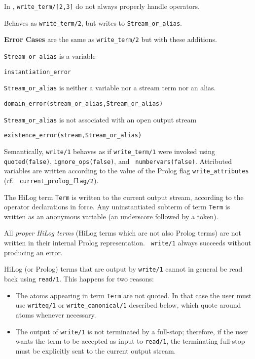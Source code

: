 \begin{description}
\compatibility In \version{}, {\tt write\_term/[2,3]} do not always
properly handle operators.

% 
Behaves as {\tt write\_term/2}, but writes to {\tt Stream\_or\_alias}.

{\bf Error Cases} are the same as {\tt write\_term/2} but with these
additions.
\bi
\item 	{\tt Stream\_or\_alias} is a variable
\bi
\item {\tt instantiation\_error}
\ei
\item 	{\tt Stream\_or\_alias} is neither a variable nor a stream term nor an alias.
\bi
\item 	{\tt domain\_error(stream\_or\_alias,Stream\_or\_alias)}
\ei
\item 	{\tt Stream\_or\_alias} is not associated with an open output stream
\bi
\item 	{\tt existence\_error(stream,Stream\_or\_alias)}
\ei
\ei

% 
Semantically, {\tt write/1} behaves as if {\tt write\_term/1} were
invoked using {\tt quoted(false)}, {\tt ignore\_ops(false)}, and {\tt
  numbervars(false)}.  Attributed variables are written according to
the value of the Prolog flag {\tt write\_attributes} (cf. {\tt
  current\_prolog\_flag/2}).

The HiLog term {\tt Term} is written to the current output stream,
according to the operator declarations in force.  Any uninstantiated
subterm of term {\tt Term} is written as an anonymous variable (an
underscore followed by a token).  

All {\em proper HiLog terms} (HiLog terms which are not also Prolog
terms) are not written in their internal Prolog representation.  {\tt
  write/1} always succeeds without producing an error.

HiLog (or Prolog) terms that are output by {\tt write/1} cannot in
general be read back using {\tt read/1}.  This happens for two
reasons:
    \begin{itemize}
    \item The atoms appearing in term {\tt Term} are not quoted. In that case 
          the user must use {\tt writeq/1} or 
          {\tt write\_canonical/1} described below, which quote around atoms 
          whenever necessary.
    \item The output of {\tt write/1} is not terminated by a full-stop;
          therefore, if the user wants the term to be accepted as input to
          {\tt read/1}, the terminating full-stop must be explicitly sent 
          to the current output stream. 
    \end{itemize}


\end{description}
